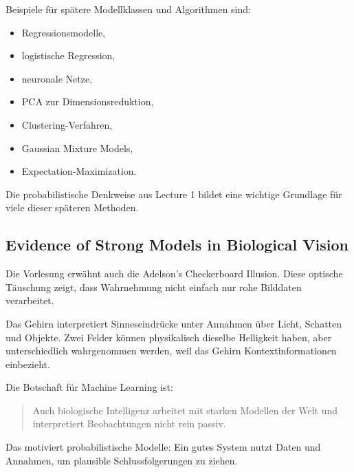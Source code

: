 \documentclass[11pt,a4paper]{scrartcl}
\begin{document}
\begin{solutionbox}
    Beispiele für spätere Modellklassen und Algorithmen sind:

    \begin{itemize}
        \item Regressionsmodelle,
        \item logistische Regression,
        \item neuronale Netze,
        \item PCA zur Dimensionsreduktion,
        \item Clustering-Verfahren,
        \item Gaussian Mixture Models,
        \item Expectation-Maximization.
    \end{itemize}

    Die probabilistische Denkweise aus Lecture 1 bildet eine wichtige Grundlage
    für viele dieser späteren Methoden.
\end{solutionbox}

\subsection{Evidence of Strong Models in Biological Vision}

\begin{solutionbox}
    Die Vorlesung erwähnt auch die Adelson's Checkerboard Illusion.
    Diese optische Täuschung zeigt, dass Wahrnehmung nicht einfach nur rohe
    Bilddaten verarbeitet.

    Das Gehirn interpretiert Sinneseindrücke unter Annahmen über Licht, Schatten
    und Objekte. Zwei Felder können physikalisch dieselbe Helligkeit haben, aber
    unterschiedlich wahrgenommen werden, weil das Gehirn Kontextinformationen
    einbezieht.
\end{solutionbox}

\begin{answerbox}
    Die Botschaft für Machine Learning ist:

    \begin{quote}
        Auch biologische Intelligenz arbeitet mit starken Modellen der Welt und
        interpretiert Beobachtungen nicht rein passiv.
    \end{quote}

    Das motiviert probabilistische Modelle: Ein gutes System nutzt Daten und
    Annahmen, um plausible Schlussfolgerungen zu ziehen.
\end{answerbox}
\end{document}
